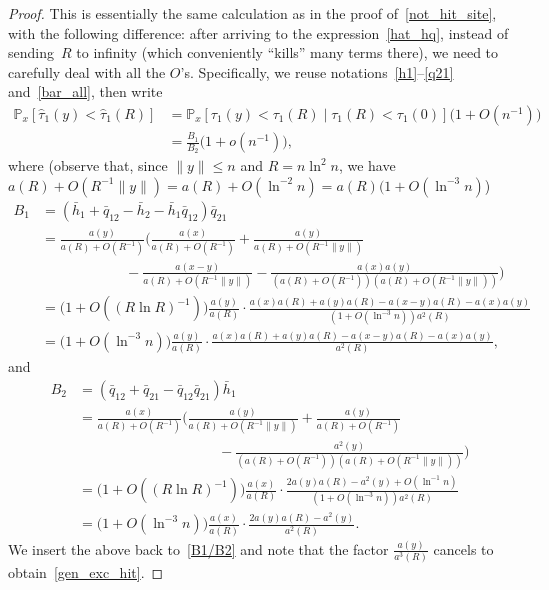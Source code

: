\documentclass[11pt]{article}
\theoremstyle{definition}
\numberwithin{equation}{section}
\numberwithin{figure}{section}
\numberwithin{table}{section}
\newcommand{\1}[1]{{\mathbf 1}{\{#1\}}}
\newcommand{\8}{{\infty}}
\newcommand{\hh}{{\bar h}}
\newcommand{\hq}{{\bar q}}
\newcommand{\IP}{{\mathbb P}}
\newcommand{\htau}{\widehat{\tau}}
\begin{document}
\begin{proof}
This is essentially the same calculation as in the proof of~\eqref{not_hit_site}, with the following difference: after arriving to the expression~\eqref{hat_hq}, instead of sending~$R$ to infinity (which conveniently ``kills'' many terms there), we need to carefully deal with all the $O$'s. Specifically, we reuse notations~\eqref{h1}--\eqref{q21} and~\eqref{bar_all}, then write
\begin{align}
\IP_x[\htau_1(y)<\htau_1(R)] &= \IP_x[\tau_1(y)<\tau_1(R)\mid \tau_1(R)<\tau_1(0)]
\big(1+O(n^{-1})\big)\nonumber\\
&= \frac{B_1}{B_2}\big(1+o(n^{-1})\big),\label{B1/B2}
\end{align}
where (observe that, since $\|y\|\leq n$ and $R=n\ln^2 n$, we have $a(R)+O(R^{-1}\|y\|) =a(R)+O(\ln^{-2} n)=a(R)(1+O(\ln^{-3} n)$)
\begin{align*}
B_1 &= (\hh_1+\hq_{12}-\hh_2-\hh_1\hq_{12})\hq_{21}\\
&= \frac{a(y)}{a(R)+O(R^{-1})}
\Big(\frac{a(x)}{a(R)+O(R^{-1})}+\frac{a(y)}{a(R)+O(R^{-1}\|y\|)}\\
& \qquad \qquad \qquad -\frac{a(x-y)}{a(R)+O(R^{-1}\|y\|)} -\frac{a(x)a(y)}{(a(R)+O(R^{-1}))(a(R)+O(R^{-1}\|y\|))}\Big)\\
&= \big(1+O((R\ln R)^{-1})\big)
\frac{a(y)}{a(R)} \cdot
\frac{a(x)a(R)+a(y)a(R)-a(x-y)a(R)-a(x)a(y)}{(1+O(\ln^{-3} n))a^2(R)}\\
&= \big(1+O(\ln^{-3} n)\big)
\frac{a(y)}{a(R)} \cdot
\frac{a(x)a(R)+a(y)a(R)-a(x-y)a(R)-a(x)a(y)}{a^2(R)},
\end{align*}
and
\begin{align*}
B_2 &= (\hq_{12}+\hq_{21}-\hq_{12}\hq_{21})\hh_1\\
&= \frac{a(x)}{a(R)+O(R^{-1})}
\Big(\frac{a(y)}{a(R)+O(R^{-1}\|y\|)}+\frac{a(y)}{a(R)+O(R^{-1})}\\
& \qquad \qquad \qquad \qquad \qquad -\frac{a^2(y)}{(a(R)+O(R^{-1}))(a(R)+O(R^{-1}\|y\|))}\Big)\\
&=\big(1+O((R\ln R)^{-1})\big)
\frac{a(x)}{a(R)} \cdot
\frac{2a(y)a(R)-a^2(y)+O(\ln^{-1}n)}{(1+O(\ln^{-3} n))a^2(R)}\\
&= \big(1+O(\ln^{-3} n)\big)
\frac{a(x)}{a(R)} \cdot \frac{2a(y)a(R)-a^2(y)}{a^2(R)}.
\end{align*}
We insert the above back to~\eqref{B1/B2} and note that the factor $\frac{a(y)}{a^3(R)}$ cancels to obtain~\eqref{gen_exc_hit}.
\end{proof}
\end{document}
